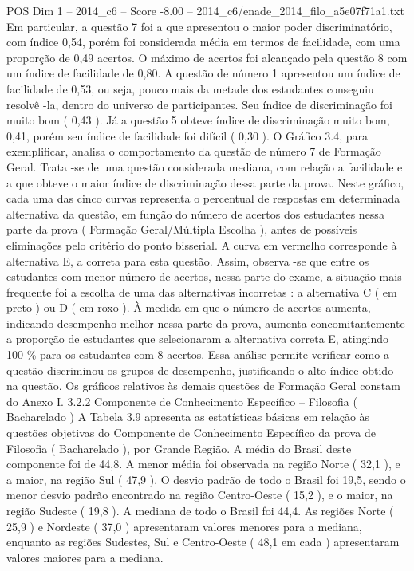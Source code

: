 \begin{textsample}{POS Dim 1 – 2014\_c6 – Score -8.00 – 2014\_c6/enade\_2014\_filo\_a5e07f71a1.txt}
Em particular, a questão 7 foi a que apresentou o maior poder discriminatório, com índice 0,54, porém foi considerada média em termos de facilidade, com uma proporção de 0,49 acertos.
O máximo de acertos foi alcançado pela questão 8 com um índice de facilidade de 0,80.
A questão de número 1 apresentou um índice de facilidade de 0,53, ou seja, pouco mais da metade dos estudantes conseguiu resolvê -la, dentro do universo de participantes.
Seu índice de discriminação foi muito bom ( 0,43 ).
Já a questão 5 obteve índice de discriminação muito bom, 0,41, porém seu índice de facilidade foi difícil ( 0,30 ).
O Gráfico 3.4, para exemplificar, analisa o comportamento da questão de número 7 de Formação Geral.
Trata -se de uma questão considerada mediana, com relação a facilidade e a que obteve o maior índice de discriminação dessa parte da prova.
Neste gráfico, cada uma das cinco curvas representa o percentual de respostas em determinada alternativa da questão, em função do número de acertos dos estudantes nessa parte da prova ( Formação Geral/Múltipla Escolha ), antes de possíveis eliminações pelo critério do ponto bisserial.
A curva em vermelho corresponde à alternativa E, a correta para esta questão.
Assim, observa -se que entre os estudantes com menor número de acertos, nessa parte do exame, a situação mais frequente foi a escolha de uma das alternativas incorretas : a alternativa C ( em preto ) ou D ( em roxo ).
À medida em que o número de acertos aumenta, indicando desempenho melhor nessa parte da prova, aumenta concomitantemente a proporção de estudantes que selecionaram a alternativa correta E, atingindo 100 \% para os estudantes com 8 acertos.
Essa análise permite verificar como a questão discriminou os grupos de desempenho, justificando o alto índice obtido na questão.
Os gráficos relativos às demais questões de Formação Geral constam do Anexo I. 3.2.2 Componente de Conhecimento Específico – Filosofia ( Bacharelado ) A Tabela 3.9 apresenta as estatísticas básicas em relação às questões objetivas do Componente de Conhecimento Específico da prova de Filosofia ( Bacharelado ), por Grande Região.
A média do Brasil deste componente foi de 44,8.
A menor média foi observada na região Norte ( 32,1 ), e a maior, na região Sul ( 47,9 ).
O desvio padrão de todo o Brasil foi 19,5, sendo o menor desvio padrão encontrado na região Centro-Oeste ( 15,2 ), e o maior, na região Sudeste ( 19,8 ).
A mediana de todo o Brasil foi 44,4.
As regiões Norte ( 25,9 ) e Nordeste ( 37,0 ) apresentaram valores menores para a mediana, enquanto as regiões Sudestes, Sul e Centro-Oeste ( 48,1 em cada ) apresentaram valores maiores para a mediana.

\end{textsample}
